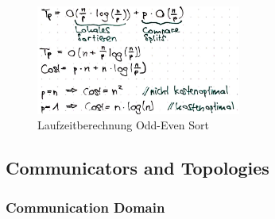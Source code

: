 \begin{figure}[H]
\centering
\includegraphics[width=0.6\textwidth]{figures/laufzeitberechnung-Odd-Even-Sort.png}
\caption{Laufzeitberechnung Odd-Even Sort}
\end{figure}

\clearpage
\hypertarget{communicators-and-topologies}{%
\subsection{Communicators and
Topologies}\label{communicators-and-topologies}}

\hypertarget{communication-domain}{%
\subsubsection{Communication Domain}\label{communication-domain}}


